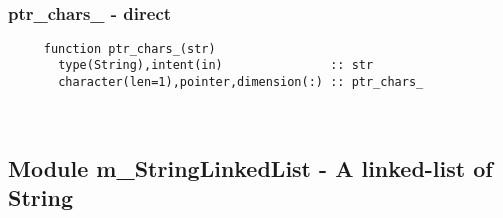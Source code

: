  
\mbox{}\hrulefill\ 
 
  \subsubsection{ptr\_chars\_ - direct}

\begin{verbatim} 
     function ptr_chars_(str)
       type(String),intent(in)               :: str
       character(len=1),pointer,dimension(:) :: ptr_chars_
 \end{verbatim}%


 
 
\mbox{}\hrulefill\ 
 
  \subsection{Module m\_StringLinkedList - A linked-list of String }

